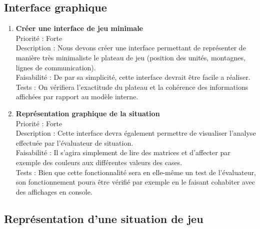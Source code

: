\documentclass[12pt]{article}
\begin{document}
		\subsection{Interface graphique}

			\begin{enumerate}

				\item \textbf{Créer une interface de jeu minimale} \\[0.7\baselineskip]
				Priorité : Forte \\[0.7\baselineskip]
				Description : Nous devons créer une interface permettant de représenter de manière très minimaliste le plateau de jeu (position des unités, montagnes, lignes de communication). \\[0.7\baselineskip]
				Faisabilité : De par sa simplicité, cette interface devrait être facile a réaliser. \\[0.7\baselineskip]
				Tests : On vérifiera l'exactitude du plateau et la cohérence des informations affichées par rapport au modèle interne. \\[0.7\baselineskip]

				\item \textbf{Représentation graphique de la situation} \\[0.7\baselineskip]
				Priorité : Forte \\[0.7\baselineskip]
				Description : Cette interface devra également permettre de visualiser l'analyse effectuée par l'évaluateur de situation. \\[0.7\baselineskip]
				Faisabilité : Il s'agira simplement de lire des matrices et d'affecter par exemple des couleurs aux différentes valeurs des cases. \\[0.7\baselineskip]
				Tests : Bien que cette fonctionnalité sera en elle-même un test de l'évaluateur, son fonctionnement poura être vérifié par exemple en le faisant cohabiter avec des affichages en console. \\[0.7\baselineskip]

				
			\end{enumerate}

		\subsection{Représentation d'une situation de jeu}
\end{document}
